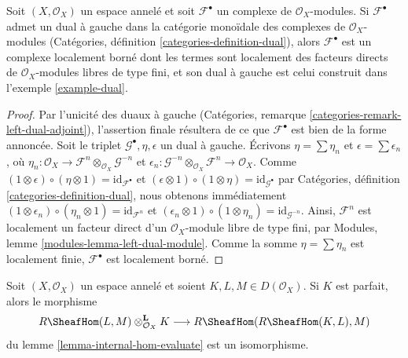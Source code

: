 {\begin{example}
\end{example}

\begin{lemma}

\label{lemma-left-dual-complex}
Soit $(X, \mathcal{O}_X)$ un espace annelé et soit $\mathcal{F}^\bullet$ un complexe de $\mathcal{O}_X$-modules. Si $\mathcal{F}^\bullet$ admet un dual à gauche dans la catégorie monoïdale des complexes de $\mathcal{O}_X$-modules (Catégories, définition \ref{categories-definition-dual}), alors $\mathcal{F}^\bullet$ est un complexe localement borné dont les termes sont localement des facteurs directs de $\mathcal{O}_X$-modules libres de type fini, et son dual à gauche est celui construit dans l'exemple \ref{example-dual}.
\end{lemma}

\begin{proof}

Par l'unicité des duaux à gauche (Catégories, remarque \ref{categories-remark-left-dual-adjoint}), l'assertion finale résultera de ce que $\mathcal{F}^\bullet$
est bien de la forme annoncée. Soit le triplet $\mathcal{G}^\bullet, \eta, \epsilon$ un dual à gauche. Écrivons $\eta = \sum \eta_n$ et $\epsilon = \sum \epsilon_n$,
où $\eta_n : \mathcal{O}_X \to
\mathcal{F}^n \otimes_{\mathcal{O}_X} \mathcal{G}^{-n}$
et
$\epsilon_n : \mathcal{G}^{-n} \otimes_{\mathcal{O}_X} \mathcal{F}^n
\to \mathcal{O}_X$. Comme
$(1 \otimes \epsilon) \circ (\eta \otimes 1) = \text{id}_{\mathcal{F}^\bullet}$
et
$(\epsilon \otimes 1) \circ (1 \otimes \eta) = \text{id}_{\mathcal{G}^\bullet}$
par Catégories, définition \ref{categories-definition-dual}, nous obtenons immédiatement
$(1 \otimes \epsilon_n) \circ (\eta_n \otimes 1) = \text{id}_{\mathcal{F}^n}$
et
$(\epsilon_n \otimes 1) \circ (1 \otimes \eta_n) =
\text{id}_{\mathcal{G}^{-n}}$. Ainsi, $\mathcal{F}^n$ est localement un facteur direct d'un $\mathcal{O}_X$-module libre de type fini, par Modules, lemme \ref{modules-lemma-left-dual-module}. Comme la somme $\eta = \sum \eta_n$ est localement finie,
$\mathcal{F}^\bullet$ est localement borné.

\end{proof}

\begin{lemma}

\label{lemma-internal-hom-evaluate-isom}
Soit $(X, \mathcal{O}_X)$ un espace annelé et soient $K, L, M \in D(\mathcal{O}_X)$. Si $K$ est parfait, alors le morphisme $$
R\SheafHom(L, M) \otimes_{\mathcal{O}_X}^\mathbf{L} K
\longrightarrow
R\SheafHom(R\SheafHom(K, L), M)
$$ du lemme \ref{lemma-internal-hom-evaluate} est un isomorphisme.
\end{lemma}

}
